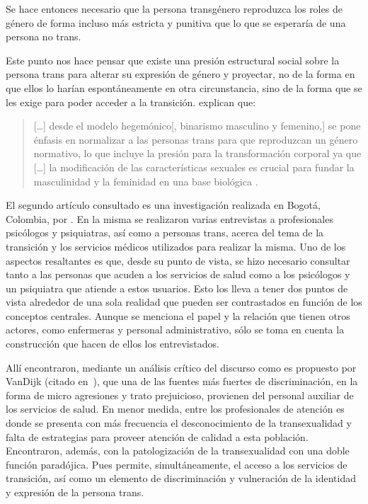 Se hace entonces necesario que la persona transgénero reproduzca los roles de
género de forma incluso más estricta y punitiva que lo que se esperaría de una
persona no trans.

Este punto nos hace pensar que existe una presión estructural social sobre la
persona trans para alterar su expresión de género y proyectar, no de la forma en
que ellos lo harían espontáneamente en otra circunstancia, sino de la forma que
se les exige para poder acceder a la transición. \textcite{Coll-Planas2015}
explican que:

\begin{quote}
[…] desde el modelo hegemónico[, binarismo masculino y femenino,] se pone
énfasis en normalizar a las personas trans para que reproduzcan un género
normativo, lo que incluye la presión para la transformación corporal ya que […]
la modificación de las características sexuales es crucial para fundar la
masculinidad y la feminidad en una base biológica \parencite[][p.
427]{Coll-Planas2015}.
\end{quote}

El segundo artículo consultado es una investigación realizada en Bogotá,
Colombia, por \textcite{LassoBaez2014}. En la misma se realizaron varias
entrevistas a profesionales psicólogos y psiquiatras, así como a personas trans,
acerca del tema de la transición y los servicios médicos utilizados para
realizar la misma. Uno de los aspectos resaltantes es que, desde su punto de
vista, se hizo necesario consultar tanto a las personas que acuden a los
servicios de salud como a los psicólogos y un psiquiatra que atiende a estos
usuarios. Esto los lleva a tener dos puntos de vista alrededor de una sola
realidad que pueden ser contrastados en función de los conceptos centrales.
Aunque se menciona el papel y la relación que tienen otros actores, como
enfermeras y personal administrativo, sólo se toma en cuenta la construcción que
hacen de ellos los entrevistados.

Allí encontraron, mediante un análisis crítico del discurso como es propuesto
por VanDijk (citado en~\cite[][p. 111]{LassoBaez2014}), que una de las fuentes
más fuertes de discriminación, en la forma de micro agresiones y trato
prejuicioso, provienen del personal auxiliar de los servicios de salud. En menor
medida, entre los profesionales de atención es donde se presenta con más
frecuencia el desconocimiento de la transexualidad y falta de estrategias para
proveer atención de calidad a esta población. Encontraron, además, con la
patologización de la transexualidad con una doble función paradójica. Pues
permite, simultáneamente, el acceso a los servicios de transición, así como un
elemento de discriminación y vulneración de la identidad y expresión de la
persona trans.

